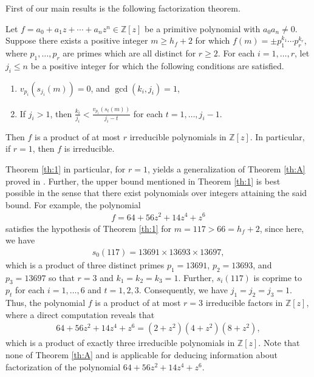 \documentclass[12pt]{amsart}%
\begin{document}
First of our main results is the following factorization theorem.
\begin{theorem}\label{th:1}
Let $f=a_0+a_1 z +\cdots+a_nz^n\in \mathbb{Z}[z]$ be a primitive polynomial with $a_0a_n\neq 0$. Suppose there exists a positive integer $m\geq h_f+2$ for which $f(m)=\pm p_1^{k_1}\cdots p_r^{k_r}$,  where $p_1,\ldots, p_r$ are  primes which are all distinct for $r\geq 2$. For each $i=1,\ldots, r$, let $j_i\leq n$ be a positive integer for which the following conditions are satisfied.
\begin{enumerate}
\item[(i)] $v_{p_i}(s_{j_i}(m))=0$, and $\gcd(k_i,j_i)=1$,
\item[(ii)] If $j_i>1$, then $\frac{k_i}{j_i}<\frac{v_{p_i}(s_t(m))}{j_i-t}$ for each $t=1,\ldots,j_i-1$.
\end{enumerate}
Then $f$ is a product of at most $r$ irreducible polynomials in $\mathbb{Z}[z]$. In particular, if $r=1$, then $f$ is irreducible.
\end{theorem}
Theorem \ref{th:1} in particular, for $r=1$, yields a generalization of Theorem \ref{th:A} proved in \cite[Theorem 1]{R-J-S}. Further, the upper bound mentioned in Theorem \ref{th:1} is best possible in the sense that there exist polynomials over integers attaining the said bound. For example, the polynomial
\begin{eqnarray*}
f=64+56z^2+14z^4+z^6
\end{eqnarray*}
satisfies the hypothesis of Theorem \ref{th:1} for $m=117>66=h_f+2$, since here, we have
\begin{eqnarray*}
s_0(117)=13691\times 13693\times 13697,
\end{eqnarray*}
which is a product of three distinct primes $p_1=13691$, $p_2=13693$, and $p_3=13697$ so that $r=3$ and $k_1=k_2=k_3=1$. Further, $s_i(117)$ is coprime to $p_t$ for each $i=1,\ldots,6$ and $t=1,2,3$. Consequently, we have $j_1=j_2=j_3=1$. Thus, the polynomial $f$ is a product of at most $r=3$ irreducible factors in $\mathbb{Z}[z]$, where a direct computation reveals that
\begin{eqnarray*}
64+56z^2+14z^4+z^6=(2+z^2)(4+z^2)(8+z^2),
\end{eqnarray*}
which is a product of exactly three irreducible polynomials in $\mathbb{Z}[z]$. Note that none of Theorem \ref{th:A} and  \cite[Theorem 1]{R-J-S} is applicable for deducing information about factorization of the polynomial $64+56z^2+14z^4+z^6$.
\end{document}

